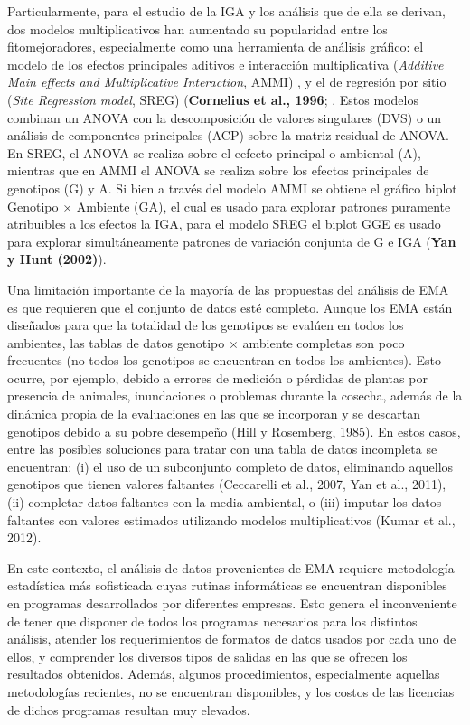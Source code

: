 Particularmente, para el estudio de la IGA y los análisis que de ella se derivan, dos modelos multiplicativos han aumentado su popularidad entre los fitomejoradores, especialmente como una herramienta de análisis gráfico: el modelo de los efectos principales aditivos e interacción multiplicativa (\emph{Additive Main effects and Multiplicative Interaction}, AMMI) \citep{Kempton1984,Gauch1988} , y el de regresión por sitio (\emph{Site Regression model}, SREG) (\textbf{Cornelius et al., 1996}; \citep{GauchZobel1997}.  Estos modelos combinan un ANOVA con la descomposición de valores singulares (DVS) o un análisis de componentes principales (ACP) sobre la matriz residual de ANOVA. En SREG, el ANOVA se realiza sobre el eefecto principal o ambiental (A),  mientras que en AMMI el ANOVA se realiza sobre los efectos principales de genotipos (G) y A. Si bien a través del modelo AMMI se obtiene el gráfico biplot Genotipo $\times$ Ambiente (GA), el cual es usado para explorar patrones puramente atribuibles a los efectos la IGA, para el modelo SREG el biplot GGE es usado para explorar simultáneamente patrones de variación conjunta de G e IGA (\textbf{Yan y Hunt (2002)}).

Una limitación importante de la mayoría de las propuestas del análisis de EMA es que requieren que el conjunto de datos esté completo. Aunque los EMA están diseñados para que la totalidad de los genotipos se evalúen en todos los ambientes,  las tablas de datos genotipo $\times$ ambiente completas son poco frecuentes (no todos los genotipos se encuentran en todos los ambientes). Esto ocurre, por ejemplo, debido a errores de medición o pérdidas de plantas por presencia de animales, inundaciones o problemas durante la cosecha, además de la dinámica propia de la evaluaciones en las que se incorporan y se descartan genotipos debido a su pobre desempeño (Hill y Rosemberg, 1985). En estos casos, entre las posibles soluciones para tratar con una tabla de datos incompleta se encuentran: (i) el uso de un subconjunto completo de datos, eliminando aquellos genotipos que tienen valores faltantes (Ceccarelli et al., 2007, Yan et al., 2011), (ii) completar datos faltantes con la media ambiental, o (iii) imputar los datos faltantes con valores estimados utilizando modelos multiplicativos (Kumar et al., 2012). 



En este contexto, el análisis de datos provenientes de EMA requiere metodología estadística más sofisticada cuyas rutinas informáticas se encuentran disponibles en programas desarrollados por diferentes empresas. Esto genera el inconveniente de tener que disponer de todos los programas necesarios para los distintos análisis, atender los requerimientos de formatos de datos usados por cada uno de ellos, y comprender los diversos tipos de salidas en las que se ofrecen los resultados obtenidos. Además, algunos procedimientos, especialmente aquellas metodologías recientes, no se encuentran disponibles, y los costos de las licencias de dichos programas resultan muy elevados. 


